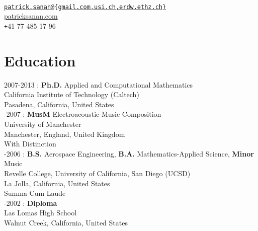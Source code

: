 \documentclass[12pt]{article}
\begin{document}
\thispagestyle{firstpagestyle}
\pagestyle{fancy}

\begin{center}
\vspace{10px}{\Large Patrick Sanan}\\
\vspace{10px}
{\tt \href{mailto:patrick.sanan@gmail.com}{patrick.sanan@\{gmail.com,usi.ch,erdw.ethz.ch\}}}\\
{\href{http://www.patricksanan.com}{patricksanan.com}}\\
{\texttt +41 77 485 17 96}\\
  \vspace{10pt}

\end{center}

\section*{Education}

2007-2013 : \textbf{Ph.D.} Applied and Computational Mathematics\\
California Institute of Technology (Caltech)\\
Pasadena, California, United States \\

-2007 : \textbf{MusM} Electroacoustic Music Composition\\
University of Manchester\\
Manchester, England, United Kingdom\\
With Distinction \\

-2006 : \textbf{B.S.} Aerospace Engineering, \textbf{B.A.} Mathematics-Applied Science, \textbf{Minor} Music\\
Revelle College, University of California, San Diego (UCSD)\\
La Jolla, California, United States\\
Summa Cum Laude\\

-2002 : \textbf{Diploma}\\
Las Lomas High School\\
Walnut Creek, California, United States\\
\end{document}
